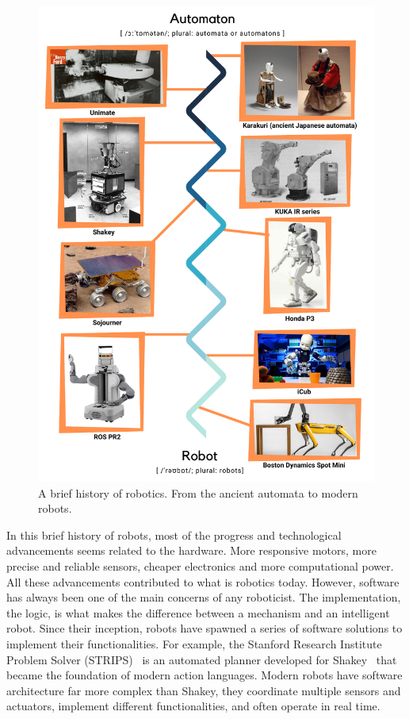 \begin{figure}
    \centering
    \includegraphics[width=\textwidth]{gfx/history}
    \caption{A brief history of robotics. From the ancient automata to modern robots.}\label{fig:history}
\end{figure}

In this brief history of robots, most of the progress and technological advancements seems related to the hardware. More responsive motors, more precise and reliable sensors, cheaper electronics and more computational power. All these advancements contributed to what is robotics today. However, software has always been one of the main concerns of any roboticist. The implementation, the logic, is what makes the difference between a mechanism and an intelligent robot. Since their inception, robots have spawned a series of software solutions to implement their functionalities. For example, the Stanford Research Institute Problem Solver (STRIPS)~\cite{lifschitz1987semantics} is an automated planner developed for Shakey~\cite{nilsson1984shakey} that became the foundation of modern action languages. Modern robots have software architecture far more complex than Shakey, they coordinate multiple sensors and actuators,  implement different functionalities, and often operate in real time.

